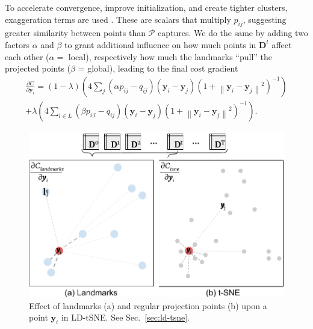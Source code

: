 To accelerate convergence, improve initialization, and create tighter clusters, exaggeration terms are used \citep{vanderMaaten2008,vanderMaaten2015,Linderman2017,Linderman2017a}. These are scalars that multiply $p_{i j}$, suggesting greater similarity between points than $\mathcal P$ captures. We do the same by adding two factors $\alpha$ and $\beta$ to grant additional influence on how much points in $\mathbf{D}^t$ affect each other ($\alpha = $ local), respectively how much the landmarks ``pull'' the projected points ($\beta$ = global), leading to the final cost gradient
%
\begin{equation*}
 \begin{aligned}
  \frac{\partial C}{\partial \mathbf{y}_{i}} =(1-\lambda)\left(4 \sum_{j}\left(\alpha p_{i j}-q_{i j}\right)\left(\mathbf{y}_{i}-\mathbf{y}_{j}\right)\left(1+\left\|\mathbf{y}_{i}-\mathbf{y}_{j}\right\|^{2}\right)^{-1}\right) \\
  +\lambda\left(4 \sum_{l \in L}\left(\beta p_{i | l}-q_{i j}\right)\left(\mathbf{y}_{i}-\mathbf{y}_{j}\right)\left(1+\left\|\mathbf{y}_{i}-\mathbf{y}_{j}\right\|^{2}\right)^{-1}\right).
 \end{aligned}
\end{equation*}
%
%
\begin{figure}[h]\centering
  \includegraphics[width=\linewidth]{figures/projection-algorithm/ldtsne.pdf}
  \caption{Effect of landmarks (a) and regular projection points (b) upon a point $\mathbf{y}_i$ in LD-tSNE. See Sec.~\ref{sec:ld-tsne}.}
  \label{fig:ldtsne}
\end{figure}

